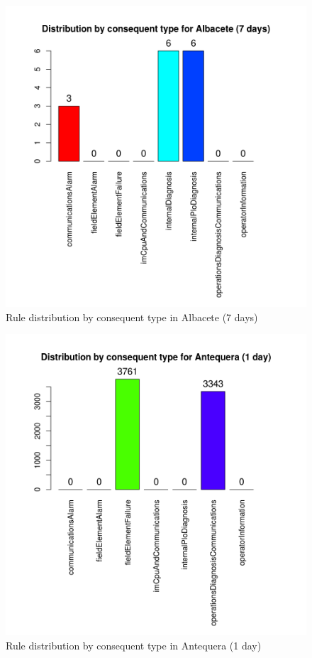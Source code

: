 \begin{figure}[hbtp]
\includegraphics[width=\textwidth]{img/conseqtypes_alb7.png}
\caption{Rule distribution by consequent type in Albacete (7 days)} \label{fig:conseqtypes_alb7}
\end{figure}

\begin{figure}[hbtp]
\includegraphics[width=\textwidth]{img/conseqtypes_ant1.png}
\caption{Rule distribution by consequent type in Antequera (1 day)} \label{fig:conseqtypes_ant1}
\end{figure}

